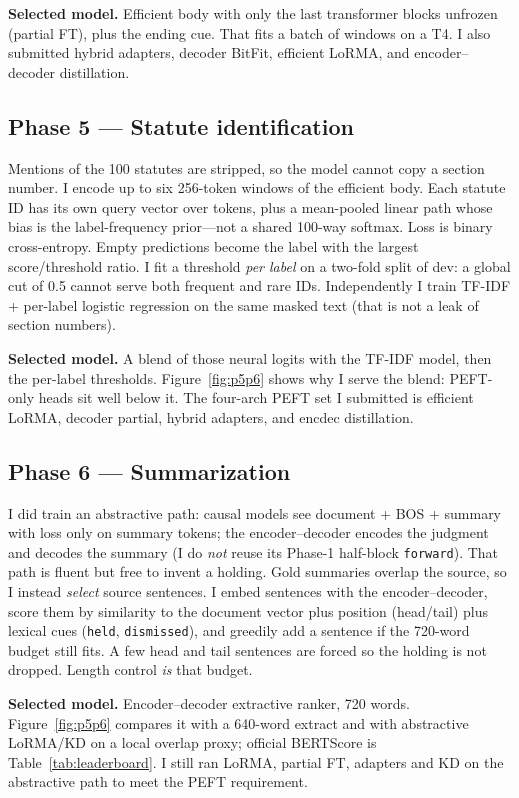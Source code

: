 \documentclass[11pt, oneside]{article}
\begin{document}
\textbf{Selected model.} Efficient body with only the last transformer blocks unfrozen (partial FT), plus the ending cue. That fits a batch of windows on a T4. I also submitted hybrid adapters, decoder BitFit, efficient LoRMA, and encoder--decoder distillation.

\subsection{Phase 5 --- Statute identification}
Mentions of the 100 statutes are stripped, so the model cannot copy a section number. I encode up to six 256-token windows of the efficient body. Each statute ID has its own query vector over tokens, plus a mean-pooled linear path whose bias is the label-frequency prior---not a shared 100-way softmax. Loss is binary cross-entropy. Empty predictions become the label with the largest score/threshold ratio. I fit a threshold \emph{per label} on a two-fold split of dev: a global cut of 0.5 cannot serve both frequent and rare IDs. Independently I train TF-IDF + per-label logistic regression on the same masked text (that is not a leak of section numbers).

\textbf{Selected model.} A blend of those neural logits with the TF-IDF model, then the per-label thresholds. Figure~\ref{fig:p5p6} shows why I serve the blend: PEFT-only heads sit well below it. The four-arch PEFT set I submitted is efficient LoRMA, decoder partial, hybrid adapters, and encdec distillation.

\subsection{Phase 6 --- Summarization}
I did train an abstractive path: causal models see document + BOS + summary with loss only on summary tokens; the encoder--decoder encodes the judgment and decodes the summary (I do \emph{not} reuse its Phase-1 half-block \texttt{forward}). That path is fluent but free to invent a holding. Gold summaries overlap the source, so I instead \emph{select} source sentences. I embed sentences with the encoder--decoder, score them by similarity to the document vector plus position (head/tail) plus lexical cues (\texttt{held}, \texttt{dismissed}), and greedily add a sentence if the 720-word budget still fits. A few head and tail sentences are forced so the holding is not dropped. Length control \emph{is} that budget.

\textbf{Selected model.} Encoder--decoder extractive ranker, 720 words. Figure~\ref{fig:p5p6} compares it with a 640-word extract and with abstractive LoRMA/KD on a local overlap proxy; official BERTScore is Table~\ref{tab:leaderboard}. I still ran LoRMA, partial FT, adapters and KD on the abstractive path to meet the PEFT requirement.
\end{document}
